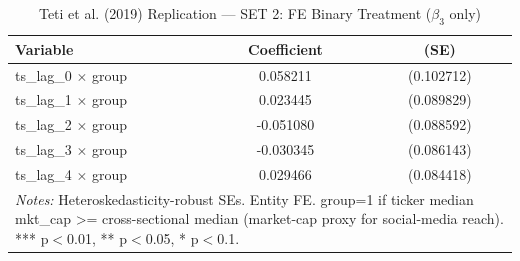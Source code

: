 \begin{table}[htbp]
\centering
\caption{Teti et al. (2019) Replication --- SET 2: FE Binary Treatment ($\beta_3$ only)}
\label{tab:teti_set2}
\begin{tabular}{lcc}
\hline\hline
Variable & Coefficient & (SE) \\
\hline
ts\_lag\_0 $\times$ group & 0.058211 & (0.102712) \\
ts\_lag\_1 $\times$ group & 0.023445 & (0.089829) \\
ts\_lag\_2 $\times$ group & -0.051080 & (0.088592) \\
ts\_lag\_3 $\times$ group & -0.030345 & (0.086143) \\
ts\_lag\_4 $\times$ group & 0.029466 & (0.084418) \\
\hline\hline
\multicolumn{3}{l}{\footnotesize \textit{Notes:} Heteroskedasticity-robust SEs. Entity FE. group=1 if ticker median mkt_cap >= cross-sectional median (market-cap proxy for social-media reach). *** p$<$0.01, ** p$<$0.05, * p$<$0.1.} \\
\end{tabular}
\end{table}